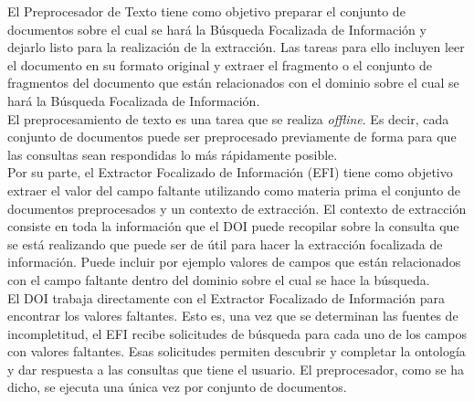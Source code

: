 El Preprocesador de Texto tiene como objetivo preparar el conjunto de documentos sobre el cual se hará la Búsqueda Focalizada de Información y dejarlo listo para la realización de la extracción. Las tareas para ello incluyen leer el documento en su formato original y extraer el fragmento o el conjunto de fragmentos del documento que están relacionados con el dominio sobre el cual se hará la Búsqueda Focalizada de Información.\\

El preprocesamiento de texto es una tarea que se realiza \emph{offline}. Es decir, cada conjunto de documentos puede ser preprocesado previamente de forma para que las consultas sean respondidas lo más rápidamente posible. \\

Por su parte, el Extractor Focalizado de Información (EFI) tiene como objetivo extraer el valor del campo faltante utilizando como materia prima el conjunto de documentos preprocesados y un contexto de extracción. El contexto de extracción consiste en toda la información que el DOI puede recopilar sobre la consulta que se está realizando que puede ser de útil para hacer la extracción focalizada de información. Puede incluir por ejemplo valores de campos que están relacionados con el campo faltante dentro del dominio sobre el cual se hace la búsqueda.  \\

El DOI trabaja directamente con el Extractor Focalizado de Información para encontrar los valores faltantes. Esto es, una vez que se determinan las fuentes de incompletitud, el EFI recibe solicitudes de búsqueda para cada uno de los campos con valores faltantes. Esas solicitudes permiten descubrir y completar la ontología y dar respuesta a las consultas que tiene el usuario. El preprocesador, como se ha dicho, se ejecuta una única vez por conjunto de documentos. \\

